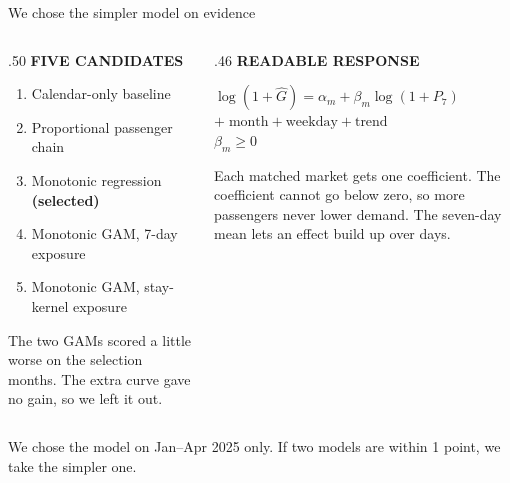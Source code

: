 \documentclass[aspectratio=169,10pt]{beamer}
\newcommand{\kicker}[1]{{\color{Accent}\scriptsize\bfseries\MakeUppercase{#1}}\par\vspace{.16cm}}
\newcommand{\smallnote}[1]{{\color{Muted}\scriptsize #1}}
\newcommand{\strong}[1]{{\bfseries #1}}
\begin{document}
\begin{frame}{We chose the simpler model on evidence}
  \begin{columns}[T,totalwidth=\linewidth]
    \begin{column}{.50\linewidth}
      \kicker{Five candidates}
      \begin{enumerate}\setlength\itemsep{.14cm}
        \item Calendar-only baseline
        \item Proportional passenger chain
        \item Monotonic regression \strong{(selected)}
        \item Monotonic GAM, 7-day exposure
        \item Monotonic GAM, stay-kernel exposure
      \end{enumerate}
      \vspace{.2cm}
      \smallnote{The two GAMs scored a little worse on the selection months. The extra curve gave no gain, so we left it out.}
    \end{column}
    \begin{column}{.46\linewidth}
      \kicker{Readable response}
      \begin{center}
      \colorbox{Pale}{\parbox{.94\linewidth}{\centering\vspace{.15cm}
        $\log(1+\widehat{G})=\alpha_{m}+\beta_{m}\log(1+P_{7})$\\[.08cm]
        $+\;\text{month}+\text{weekday}+\text{trend}$\\[.08cm]
        $\beta_{m}\geq 0$\vspace{.15cm}}}
      \end{center}
      Each matched market gets one coefficient. The coefficient cannot go below zero, so more passengers never lower demand. The seven-day mean lets an effect build up over days.
    \end{column}
  \end{columns}
  \vfill
  \smallnote{We chose the model on Jan--Apr 2025 only. If two models are within 1 point, we take the simpler one.}
\end{frame}
\end{document}
